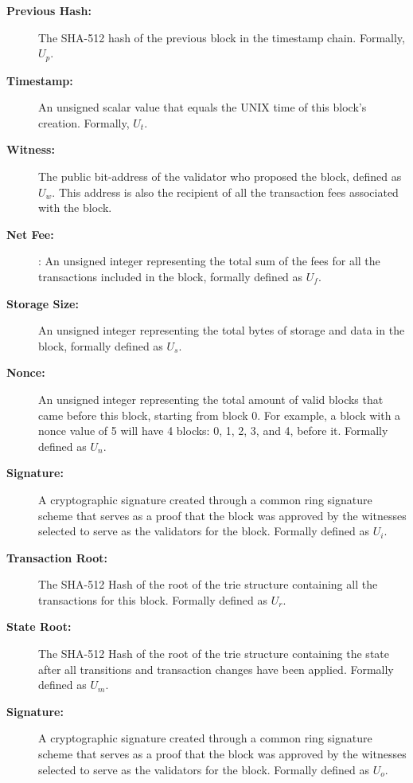 \documentclass[conference]{IEEEtran}
\begin{document}
\begin{description}
\item[\textbf{Previous Hash:}]\hspace{40} The SHA-512 hash of the previous block in the timestamp chain. Formally, $U_p$.
\item[\textbf{Timestamp:}]\hspace{30} An unsigned scalar value that equals the UNIX time of this block's creation. Formally, $U_t$.
\item[\textbf{Witness:}]\hspace{10} The public bit-address of the validator who proposed the block, defined as $U_w$. This address is also the recipient of all the transaction fees associated with the block.
\item[\textbf{Net Fee:}]\hspace{10}: An unsigned integer representing the total sum of the fees for all the transactions included in the block, formally defined as $U_f$.
\item[\textbf{Storage Size:}]\hspace{30}  An unsigned integer representing the total bytes of storage and data in the block, formally defined as $U_s$.
\item[\textbf{Nonce:}]\hspace{5} An unsigned integer representing the total amount of valid blocks that came before this block, starting from block 0. For example, a block with a nonce value of 5 will have 4 blocks: 0, 1, 2, 3, and 4, before it. Formally defined as $U_n$.
\item[\textbf{Signature:}]\hspace{20} A cryptographic signature created through a common ring signature scheme that serves as a proof that the block was approved by the witnesses selected to serve as the validators for the block. Formally defined as $U_i$.
\item[\textbf{Transaction Root:}]\hspace{50} The SHA-512 Hash of the root of the trie structure containing all the transactions for this block. Formally defined as $U_r$.
\item[\textbf{State Root:}]\hspace{20} The SHA-512 Hash of the root of the trie structure containing the state after all transitions and transaction changes have been applied. Formally defined as $U_m$.
\item[\textbf{Signature:}]\hspace{20} A cryptographic signature created through a common ring signature scheme that serves as a proof that the block was approved by the witnesses selected to serve as the validators for the block. Formally defined as $U_o$.
\end{description}
\end{document}
